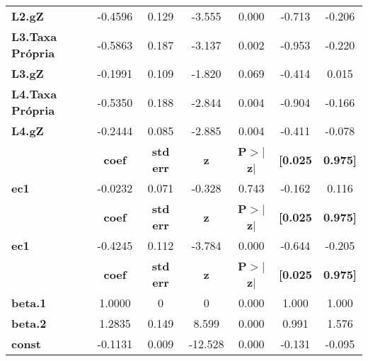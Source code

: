 \begin{center}
\begin{tabular}{lcccccc}
\textbf{L2.gZ}           &      -0.4596  &        0.129     &    -3.555  &         0.000        &       -0.713    &       -0.206     \\
\textbf{L3.Taxa Própria} &      -0.5863  &        0.187     &    -3.137  &         0.002        &       -0.953    &       -0.220     \\
\textbf{L3.gZ}           &      -0.1991  &        0.109     &    -1.820  &         0.069        &       -0.414    &        0.015     \\
\textbf{L4.Taxa Própria} &      -0.5350  &        0.188     &    -2.844  &         0.004        &       -0.904    &       -0.166     \\
\textbf{L4.gZ}           &      -0.2444  &        0.085     &    -2.885  &         0.004        &       -0.411    &       -0.078     \\
             & \textbf{coef} & \textbf{std err} & \textbf{z} & \textbf{P$> |$z$|$} & \textbf{[0.025} & \textbf{0.975]}  \\
\midrule
\textbf{ec1} &      -0.0232  &        0.071     &    -0.328  &         0.743        &       -0.162    &        0.116     \\
             & \textbf{coef} & \textbf{std err} & \textbf{z} & \textbf{P$> |$z$|$} & \textbf{[0.025} & \textbf{0.975]}  \\
\midrule
\textbf{ec1} &      -0.4245  &        0.112     &    -3.784  &         0.000        &       -0.644    &       -0.205     \\
                & \textbf{coef} & \textbf{std err} & \textbf{z} & \textbf{P$> |$z$|$} & \textbf{[0.025} & \textbf{0.975]}  \\
\midrule
\textbf{beta.1} &       1.0000  &            0     &         0  &         0.000        &        1.000    &        1.000     \\
\textbf{beta.2} &       1.2835  &        0.149     &     8.599  &         0.000        &        0.991    &        1.576     \\
\textbf{const}  &      -0.1131  &        0.009     &   -12.528  &         0.000        &       -0.131    &       -0.095     \\
\bottomrule
\end{tabular}
\end{center}